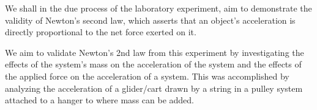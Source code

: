 {We shall in the due process of the laboratory experiment, aim to demonstrate the validity of Newton's second law, which asserts that an object's acceleration is directly proportional to the net force exerted on it.}

{We aim to validate Newton's 2nd law from this experiment by investigating the effects of the system's mass on the acceleration of the system and the effects of the applied force on the acceleration of a system. This was accomplished by analyzing the acceleration of a glider/cart drawn by a string in a pulley system attached to a hanger to where mass can be added.}

{}

